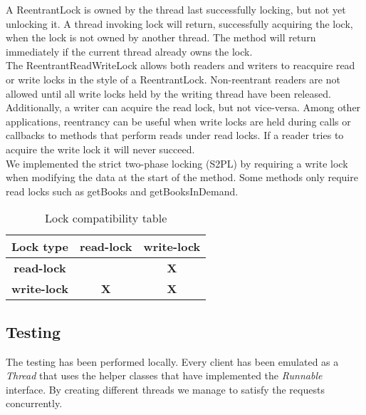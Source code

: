 \documentclass{article}      %
\begin{document}
A ReentrantLock is owned by the thread last successfully locking, but not yet unlocking it. A thread invoking lock will return, successfully acquiring the lock, when the lock is not owned by another thread. The method will return immediately if the current thread already owns the lock.\\

The ReentrantReadWriteLock allows both readers and writers to reacquire read or write locks in the style of a ReentrantLock. Non-reentrant readers are not allowed until all write locks held by the writing thread have been released. Additionally, a writer can acquire the read lock, but not vice-versa. Among other applications, reentrancy can be useful when write locks are held during calls or callbacks to methods that perform reads under read locks. If a reader tries to acquire the write lock it will never succeed.\\

We implemented the strict two-phase locking (S2PL) by requiring a write lock when modifying the data at the start of the method. Some methods only require read locks such as getBooks and getBooksInDemand.\\

\begin{table}[h]
\begin{center}
\begin{tabular}{|c|c|c|}
\hline
{\bf{Lock type}} & \bf{read-lock} & \bf{write-lock} \\ \hline
\bf{read-lock} & \multicolumn{1}{l|}{} & \bf{X} \\ \hline
\bf{write-lock} & \bf{X} & \bf{X} \\ \hline
\end{tabular}
\caption{Lock compatibility table}
\label{Lock compatibility table}
\end{center}
\end{table}

\subsection*{Testing}

The testing has been performed locally. Every client has been emulated as a \emph{Thread} that uses the helper classes that have implemented the \emph{Runnable} interface. By creating different threads we manage to satisfy the requests concurrently.  
\end{document}
